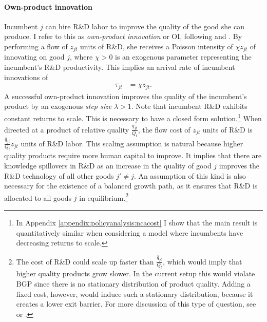 \documentclass[ecta,nameyear,final]{econsocart}
\theoremstyle{plain}
\theoremstyle{remark}
\begin{document}
\paragraph{Own-product innovation}\label{subsubsec:OI}

Incumbent $j$ can hire R\&D labor to improve the quality of the good she can produce. I refer to this as \textit{own-product innovation} or OI, following \cite{garcia-macia_how_2019} and \cite{klenow_innovative_2020}. By performing a flow of $z_{jt}$ units of R\&D, she receives a Poisson intensity of $\chi z_{jt}$ of innovating on good $j$, where $\chi > 0$ is an exogenous parameter representing the incumbent's R\&D productivity. This implies an arrival rate of incumbent innovations of 
\begin{align}
	\tau_{jt} &= \chi z_{jt}.
\end{align}
A successful own-product innovation improves the quality of the incumbent's product by an exogenous \emph{step size} $\lambda > 1$. Note that incumbent R\&D exhibits constant returns to scale. This is necessary to have a closed form solution.\footnote{In Appendix \ref{appendix:policyanalysis:ncacost} I show that the main result is quantitatively similar when considering a model where incumbents have decreasing returns to scale.} When directed at a product of relative quality $\frac{\bar{q}_{jt}}{Q_t}$, the flow cost of $z_{jt}$ units of R\&D is $\frac{\bar{q}_{jt}}{Q_t} z_{jt}$ units of R\&D labor. This scaling assumption is natural because higher quality products require more human capital to improve. It implies that there are knowledge spillovers in R\&D as an increase in the quality of good $j$ improves the R\&D technology of all other goods $j' \ne j$. An assumption of this kind is also necessary for the existence of a balanced growth path, as it ensures that R\&D is allocated to all goods $j$ in equilibrium.\footnote{The cost of R\&D could scale up faster than $\frac{\bar{q}_{jt}}{Q_t}$, which would imply that higher quality products grow slower. In the current setup this would violate BGP since there is no stationary distribution of product quality. Adding a fixed cost, however, would induce such a stationary distribution, because it creates a lower exit barrier. For more discussion of this type of question, see \cite{gabaix_power_2009} or \cite{acemoglu_innovation_2015}.}
\end{document}

